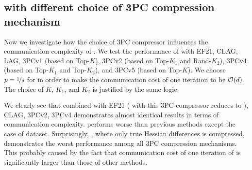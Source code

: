 \documentclass[11pt]{article}
\begin{document}
	\subsection{ with different choice of 3PC compression mechanism}
	
	Now we investigate how the choice of 3PC compressor influences the communication complexity of . We test the performance of  with EF21, CLAG, LAG, 3PCv1 (based on Top-$K$), 3PCv2 (based on Top-$K_1$ and Rand-$K_2$), 3PCv4 (based on Top-$K_1$ and Top-$K_2$), and 3PCv5 (based on Top-$K$). We choose $p=\nicefrac{1}{d}$ for  in order to make the communication cost of one iteration to be $\mathcal{O}(d)$. The choice of $K$, $K_1$, and $K_2$ is justified by the same logic. 
	
	We clearly see that  combined with EF21 ( with this 3PC compressor reduces to ), CLAG, 3PCv2, 3PCv4 demonstrates almost identical results in terms of communication complexity.  performs worse than previous methods except the case of  dataset. Surprisingly, , where only true Hessian differences is compressed, demonstrates the worst performance among all 3PC compression mechanisms. This probably caused by the fact that communication cost of one iteration of  is significantly larger than those of other  methods.
	
	
	
\end{document}
